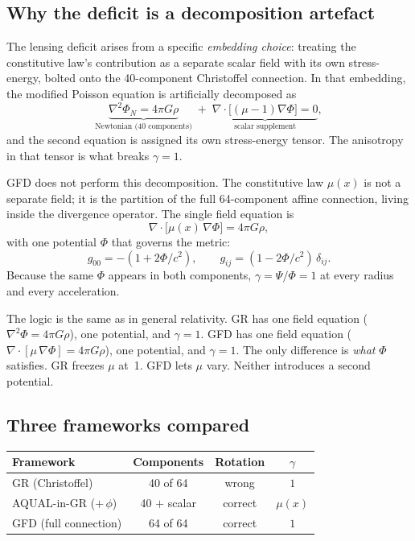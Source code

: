 \documentclass[11pt]{article}
\begin{document}
\subsection*{Why the deficit is a decomposition artefact}

The lensing deficit arises from a specific
\textit{embedding choice}: treating the constitutive
law's contribution as a separate scalar field with its
own stress-energy, bolted onto the 40-component
Christoffel connection.  In that embedding, the modified
Poisson equation is artificially decomposed as
\begin{equation}
  \underbrace{\nabla^2\Phi_N = 4\pi G\rho}_{\text{Newtonian (40 components)}}
  \;+\;
  \underbrace{\nabla\!\cdot\bigl[(\mu{-}1)\nabla\Phi\bigr]
  = 0}_{\text{scalar supplement}},
  \label{eq:decomposition}
\end{equation}
and the second equation is assigned its own
stress-energy tensor.  The anisotropy in that tensor is
what breaks $\gamma = 1$.

GFD does not perform this decomposition.  The
constitutive law $\mu(x)$ is not a separate field; it is
the partition of the full 64-component affine connection,
living inside the divergence operator.  The single
field equation is
\begin{equation}
  \nabla\!\cdot\bigl[\mu(x)\,\nabla\Phi\bigr]
  = 4\pi G\rho,
  \label{eq:gfd_poisson}
\end{equation}
with one potential $\Phi$ that governs the metric:
\begin{equation}
  g_{00} = -(1 + 2\Phi/c^2), \qquad
  g_{ij} = (1 - 2\Phi/c^2)\,\delta_{ij}.
  \label{eq:metric}
\end{equation}
Because the same $\Phi$ appears in both components,
$\gamma = \Psi/\Phi = 1$ at every radius and every
acceleration.

The logic is the same as in general relativity.  GR
has one field equation ($\nabla^2\Phi = 4\pi G\rho$),
one potential, and $\gamma = 1$.  GFD has one field
equation ($\nabla\!\cdot[\mu\,\nabla\Phi] = 4\pi G\rho$),
one potential, and $\gamma = 1$.  The only difference is
\textit{what} $\Phi$ satisfies.  GR freezes $\mu$ at~1.
GFD lets $\mu$ vary.  Neither introduces a second
potential.

\subsection*{Three frameworks compared}

\begin{center}
\renewcommand{\arraystretch}{1.3}
\begin{tabular}{lccc}
\hline
  Framework & Components & Rotation & $\gamma$ \\
\hline
GR (Christoffel)
  & 40 of 64 & wrong & $1$ \\
AQUAL-in-GR ($+\,\phi$)
  & 40 $+$ scalar & correct & $\mu(x)$ \\
GFD (full connection)
  & 64 of 64 & correct & $1$ \\
\hline
\end{tabular}
\end{center}
\end{document}
